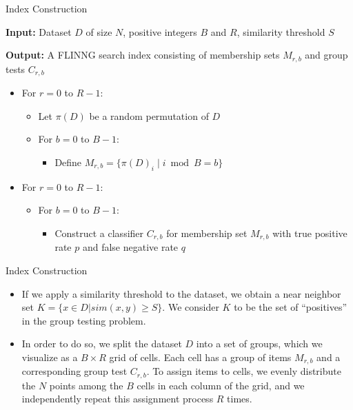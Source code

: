 \documentclass[Serif, 10pt, brown]{beamer}
\theoremstyle{example}
\theoremstyle{plain}
\begin{document}
\begin{frame}{Index Construction}

\textbf{Input:} Dataset $D$ of size $N$, positive integers $B$ and $R$, similarity threshold $S$

\textbf{Output:} A FLINNG search index consisting of membership sets $M_{r,b}$ and group tests $C_{r,b}$

\begin{itemize}
    \item For $r = 0$ to $R - 1$:
    \begin{itemize}
        \item Let $\pi(D)$ be a random permutation of $D$
        \item For $b = 0$ to $B - 1$:
        \begin{itemize}
            \item Define $M_{r,b} = \{ \pi(D)_i \mid i \bmod B = b \}$
        \end{itemize}
    \end{itemize}
    
    \item For $r = 0$ to $R - 1$:
    \begin{itemize}
        \item For $b = 0$ to $B - 1$:
        \begin{itemize}
            \item Construct a classifier $C_{r,b}$ for membership set $M_{r,b}$ with true positive rate $p$ and false negative rate $q$
        \end{itemize}
    \end{itemize}
\end{itemize}
\end{frame}

\begin{frame}{Index Construction}
	\begin{itemize}
		\item If we apply a similarity
		threshold to the dataset, we obtain a near neighbor set $K= \{x \in D | sim(x,y) \geq S\}$. We consider $K$ to be the set of “positives” in the group testing problem.
		\item In order to do so, we split the dataset $D$ into a set of groups, which we visualize as a $B \times R$ grid
		of cells. Each cell has a group of items $M_{r,b}$ and a corresponding group test $C_{r,b}$. To assign items
		to cells, we evenly distribute the $N$ points among the $B$ cells in each column of the grid, and we independently repeat this assignment process $R$ times.
	\end{itemize}
\end{frame}
\end{document}
